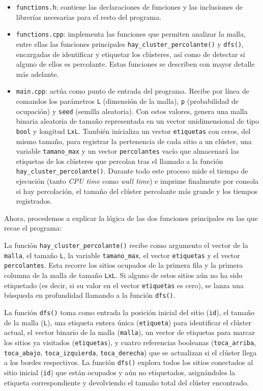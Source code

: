 \documentclass[%
 reprint,
 amsmath,amssymb,
 aps,
]{revtex4-2}
\begin{document}
\begin{itemize}
    \item \texttt{functions.h}: contiene las declaraciones de funciones y las inclusiones de librerías necesarias para el resto del programa.
    
    \item \texttt{functions.cpp}: implementa las funciones que permiten analizar la malla, entre ellas las funciones principales \texttt{hay\_cluster\_percolante()} y \texttt{dfs()}, encargadas de identificar y etiquetar los clústeres, así como de detectar si alguno de ellos es percolante. Estas funciones se describen con mayor detalle más adelante.
    
    \item \texttt{main.cpp}: actúa como punto de entrada del programa. Recibe por línea de comandos los parámetros \texttt{L} (dimensión de la malla), \texttt{p} (probabilidad de ocupación) y \texttt{seed} (semilla aleatoria). Con estos valores, genera una malla binaria aleatoria de tamaño representada en un vector unidimensional de tipo \texttt{bool} y longitud \texttt{LxL}. También inicializa un vector \texttt{etiquetas} con ceros, del mismo tamaño, para registrar la pertenencia de cada sitio a un clúster, una variable \texttt{tamano\_max} y un vector \texttt{percolantes} vacío que almacenará las etiquetas de los clústeres que percolan tras el llamado a la función \texttt{hay\_cluster\_percolante()}. Durante todo este proceso mide el tiempo de ejecución (tanto \textit{CPU time} como \textit{wall time}) e imprime finalmente por consola si hay percolación, el tamaño del clúster percolante más grande y los tiempos registrados.
    
\end{itemize}

Ahora, procedemos a explicar la lógica de las dos funciones principales en las que recae el programa:

La función \texttt{hay\_cluster\_percolante()} recibe como argumento el vector de la \texttt{malla}, el tamaño \texttt{L}, la variable \texttt{tamano\_max}, el vector \texttt{etiquetas} y el vector \texttt{percolantes}. Esta recorre los sitios ocupados de la primera fila y la primera columna de la malla de tamaño \texttt{LxL}. Si alguno de estos sitios aún no ha sido etiquetado (es decir, si su valor en el vector \texttt{etiquetas} es cero), se lanza una búsqueda en profundidad llamando a la función \texttt{dfs()}.

La función \texttt{dfs()} toma como entrada la posición inicial del sitio (\texttt{id}), el tamaño de la malla (\texttt{L}), una etiqueta entera única (\texttt{etiqueta}) para identificar el clúster actual, el vector binario de la malla (\texttt{malla}), un vector de etiquetas para marcar los sitios ya visitados (\texttt{etiquetas}), y cuatro referencias booleanas (\texttt{toca\_arriba}, \texttt{toca\_abajo}, \texttt{toca\_izquierda}, \texttt{toca\_derecha}) que se actualizan si el clúster llega a los bordes respectivos. La función \texttt{dfs()} explora todos los sitios conectados al sitio inicial (\texttt{id}) que están ocupados y aún no etiquetados, asignándoles la etiqueta correspondiente y devolviendo el tamaño total del clúster encontrado. 
\end{document}
